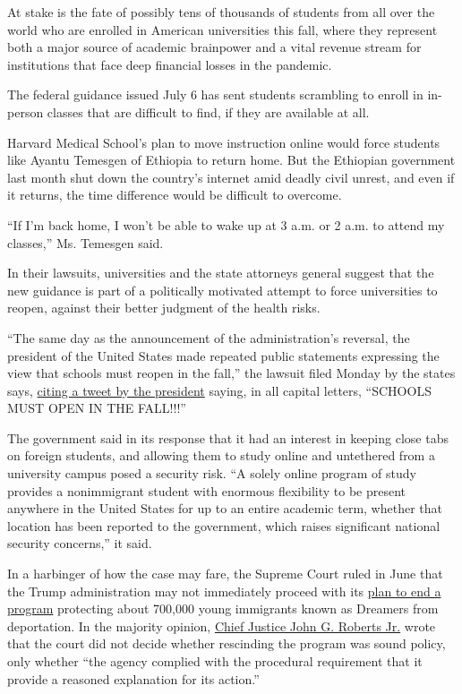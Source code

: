 At stake is the fate of possibly tens of thousands of students from all
over the world who are enrolled in American universities this fall,
where they represent both a major source of academic brainpower and a
vital revenue stream for institutions that face deep financial losses in
the pandemic.

The federal guidance issued July 6 has sent students scrambling to
enroll in in-person classes that are difficult to find, if they are
available at all.

Harvard Medical School's plan to move instruction online would force
students like Ayantu Temesgen of Ethiopia to return home. But the
Ethiopian government last month shut down the country's internet amid
deadly civil unrest, and even if it returns, the time difference would
be difficult to overcome.

``If I'm back home, I won't be able to wake up at 3 a.m. or 2 a.m. to
attend my classes,'' Ms. Temesgen said.

In their lawsuits, universities and the state attorneys general suggest
that the new guidance is part of a politically motivated attempt to
force universities to reopen, against their better judgment of the
health risks.

``The same day as the announcement of the administration's reversal, the
president of the United States made repeated public statements
expressing the view that schools must reopen in the fall,'' the lawsuit
filed Monday by the states says,
\href{https://twitter.com/realdonaldtrump/status/1280209946085339136}{citing
a tweet by the president} saying, in all capital letters, ``SCHOOLS MUST
OPEN IN THE FALL!!!''

The government said in its response that it had an interest in keeping
close tabs on foreign students, and allowing them to study online and
untethered from a university campus posed a security risk. ``A solely
online program of study provides a nonimmigrant student with enormous
flexibility to be present anywhere in the United States for up to an
entire academic term, whether that location has been reported to the
government, which raises significant national security concerns,'' it
said.

In a harbinger of how the case may fare, the Supreme Court ruled in June
that the Trump administration may not immediately proceed with its
\href{https://www.nytimes.com/2017/09/05/us/politics/trump-daca-dreamers-immigration.html}{plan
to end a program} protecting about 700,000 young immigrants known as
Dreamers from deportation. In the majority opinion,
\href{https://www.nytimes.com/2020/06/18/us/trump-daca-supreme-court.html}{Chief
Justice John G. Roberts Jr.} wrote that the court did not decide whether
rescinding the program was sound policy, only whether ``the agency
complied with the procedural requirement that it provide a reasoned
explanation for its action.''

